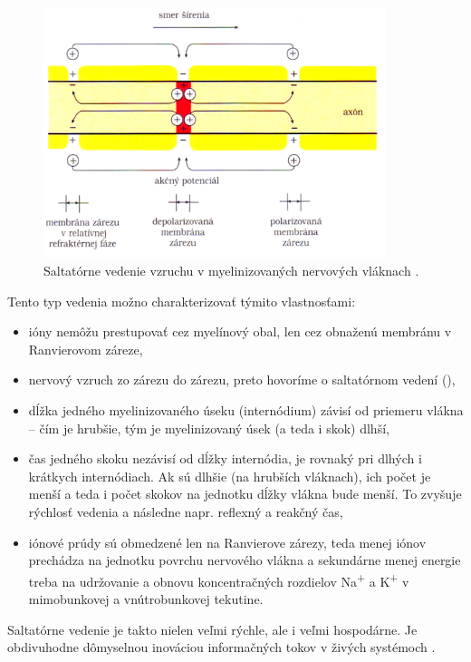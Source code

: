 \begin{figure}[!htbp]
  \centering
  \includegraphics[width=10cm]{img/myelin-clr.png}
  \caption{Saltatórne vedenie vzruchu v myelinizovaných nervových vláknach \cite{javorkaLekarskaFyziologiaUcebnica2001}.}
  \label{myelin}
\end{figure}	

Tento typ vedenia možno charakterizovať týmito vlastnosťami: 
\begin{itemize}
  \item ióny nemôžu prestupovať cez myelínový obal, len cez obnaženú membránu v Ranvierovom záreze,
  \item nervový vzruch  zo zárezu do zárezu, preto hovoríme o saltatórnom vedení (),
  \item dĺžka jedného myelinizovaného úseku (internódium) závisí od priemeru vlákna {--} čím je hrubšie, tým je myelinizovaný úsek (a teda i skok) dlhší,
  \item čas jedného skoku nezávisí od dĺžky internódia, je rovnaký pri dlhých i krátkych internódiach. Ak sú dlhšie (na hrubších vláknach), ich počet je menší a teda i počet skokov na jednotku dĺžky vlákna bude menší. To zvyšuje rýchlosť vedenia a následne napr. reflexný a reakčný čas,
  \item iónové prúdy sú obmedzené len na Ranvierove zárezy, teda menej iónov prechádza na jednotku povrchu nervového vlákna a sekundárne menej energie treba na udržovanie a obnovu koncentračných rozdielov Na\textsuperscript{+} a K\textsuperscript{+} v mimobunkovej a vnútrobunkovej tekutine.
\end{itemize}

Saltatórne vedenie je takto nielen veľmi rýchle, ale i veľmi hospodárne. Je obdivuhodne dômyselnou inováciou informačných tokov v živých systémoch \cite{bederFyziologiaCloveka2005}.

